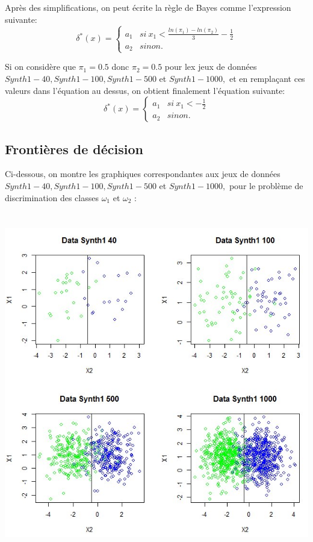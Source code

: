 \documentclass[a4paper,11pt]{article}
\begin{document}
Après des simplifications, on peut écrite la règle de Bayes comme l'expression suivante: 
\[\delta^{*}(x) = \begin{cases} 
  a_{1} & si  \> x_1 < \frac{ln(\pi_1)-ln(\pi_2)}{3} - \frac{1}{2} \\
  a_{2} & sinon.
\end{cases}\]

Si on considère que $\pi_1 = 0.5$ donc $\pi_2= 0.5$ pour lex jeux de données $Synth1-40, Synth1-100, Synth1-500$ et $Synth1-1000,$ et en remplaçant ces valeurs dans l'équation au dessus, on obtient finalement l'équation suivante:
\[\delta^{*}(x) = \begin{cases} 
  a_{1} & si  \> x_1 < - \frac{1}{2} \\
  a_{2} & sinon.
\end{cases}\]



\subsection*{Frontières de décision}

Ci-dessous, on montre les graphiques correspondantes aux jeux de données $Synth1-40, Synth1-100, Synth1-500$ et $Synth1-1000,$ pour le problème de discrimination des classes $\omega_{1}$ et $\omega_{2}$ :
\begin{center}
  \includegraphics[height = 15cm, width = 15cm]{data.jpg}
\end{center}
\end{document}
